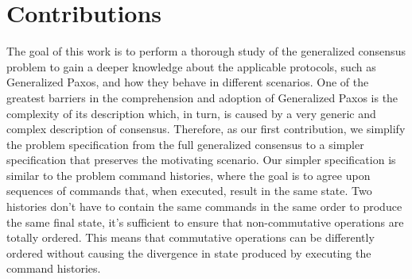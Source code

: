\section{Contributions}
The goal of this work is to perform a thorough study of the generalized consensus problem to gain a deeper knowledge about the applicable protocols, such as Generalized Paxos, and how they behave in different scenarios. One of the greatest barriers in the comprehension and adoption of Generalized Paxos is the complexity of its description which, in turn, is caused by a very generic and complex description of consensus. Therefore, as our first contribution, we simplify the problem specification from the full generalized consensus to a simpler specification that preserves the motivating scenario. Our simpler specification is similar to the problem command histories, where the goal is to agree upon sequences of commands that, when executed, result in the same state. Two histories don't have to contain the same commands in the same order to produce the same final state, it's sufficient to ensure that non-commutative operations are totally ordered. This means that commutative operations can be differently ordered without causing the divergence in state produced by executing the command histories. \par

